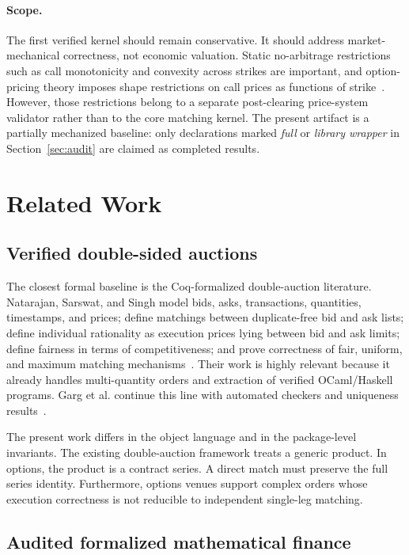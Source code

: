 \documentclass[11pt]{article}
\begin{document}
\paragraph{Scope.}
The first verified kernel should remain conservative. It should address market-mechanical correctness, not economic valuation. Static no-arbitrage restrictions such as call monotonicity and convexity across strikes are important, and option-pricing theory imposes shape restrictions on call prices as functions of strike~\cite{AitSahaliaDuarte2002}. However, those restrictions belong to a separate post-clearing price-system validator rather than to the core matching kernel. The present artifact is a partially mechanized baseline: only declarations marked \emph{full} or \emph{library wrapper} in Section~\ref{sec:audit} are claimed as completed results.

\section{Related Work}

\subsection{Verified double-sided auctions}

The closest formal baseline is the Coq-formalized double-auction literature. Natarajan, Sarswat, and Singh model bids, asks, transactions, quantities, timestamps, and prices; define matchings between duplicate-free bid and ask lists; define individual rationality as execution prices lying between bid and ask limits; define fairness in terms of competitiveness; and prove correctness of fair, uniform, and maximum matching mechanisms~\cite{NatarajanSarswatSingh2021}. Their work is highly relevant because it already handles multi-quantity orders and extraction of verified OCaml/Haskell programs. Garg et al. continue this line with automated checkers and uniqueness results~\cite{GargRajaSarswatSingh2024}.

The present work differs in the object language and in the package-level invariants. The existing double-auction framework treats a generic product. In options, the product is a contract series. A direct match must preserve the full series identity. Furthermore, options venues support complex orders whose execution correctness is not reducible to independent single-leg matching.

\subsection{Audited formalized mathematical finance}
\end{document}
